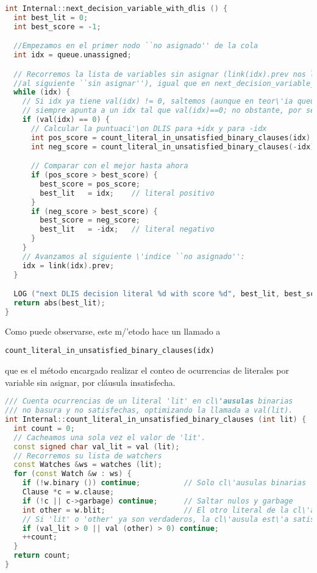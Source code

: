 \begin{lstlisting}[escapechar=!., language=C++]
int Internal::next_decision_variable_with_dlis () {
  int best_lit = 0;
  int best_score = -1;

  //Empezamos en el primer nodo ``no asignado'' de la cola
  int idx = queue.unassigned;

  // Recorremos la lista de variables sin asignar (link(idx).prev nos lleva
  //al siguiente ``sin asignar''), igual que en next_decision_variable_on_queue().
  while (idx) {
    // Si idx ya tiene val(idx) != 0, saltemos (aunque en teor\'ia queue.unassigned
    // siempre apunta a un idx tal que val(idx)==0; no obstante, por seguridad lo comprobamos).
    if (val(idx) == 0) {
      // Calcular la puntuaci'\on DLIS para +idx y para -idx
      int pos_score = count_literal_in_unsatisfied_binary_clauses(idx);
      int neg_score = count_literal_in_unsatisfied_binary_clauses(-idx);

      // Comparar con el mejor hasta ahora
      if (pos_score > best_score) {
        best_score = pos_score;
        best_lit   = idx;    // literal positivo
      }
      if (neg_score > best_score) {
        best_score = neg_score;
        best_lit   = -idx;   // literal negativo
      }
    }
    // Avanzamos al siguiente \'indice ``no asignado'':
    idx = link(idx).prev;
  }

  LOG ("next DLIS decision literal %d with score %d", best_lit, best_score);
  return abs(best_lit);
}
\end{lstlisting}
Como puede observarse, este m/'etodo hace un llamado a \begin{lstlisting}
count_literal_in_unsatisfied_binary_clauses(idx)
\end{lstlisting} 
que es el m\'etodo encargado realizar el conteo de ocurrencias de literales por variable sin asignar, por cl\'ausula insatisfecha.

\begin{lstlisting}[escapechar=!., language=C++]
/// Cuenta ocurrencias de un literal 'lit' en cl\'ausulas binarias
/// no basura y no satisfechas, optimizando la llamada a val(lit).
int Internal::count_literal_in_unsatisfied_binary_clauses (int lit) {
  int count = 0;
  // Cacheamos una sola vez el valor de 'lit'.
  const signed char val_lit = val (lit);
  // Recorremos su lista de watchers
  const Watches &ws = watches (lit);
  for (const Watch &w : ws) {
    if (!w.binary ()) continue;          // Solo cl\'ausulas binarias
    Clause *c = w.clause;                
    if (!c || c->garbage) continue;      // Saltar nulos y garbage
    int other = w.blit;                  // El otro literal de la cl\'ausula
    // Si 'lit' o 'other' ya son verdaderos, la cl\'ausula est\'a satisfecha
    if (val_lit > 0 || val (other) > 0) continue;
    ++count;
  }
  return count;
}
\end{lstlisting}

